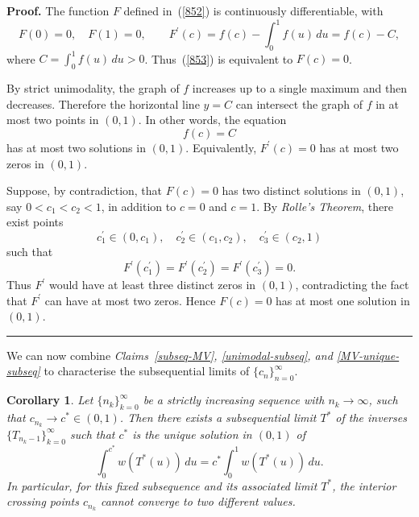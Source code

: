 \documentclass[onecolumn]{article}
\newtheorem{corollary}[theorem]{Corollary}
\newenvironment{proof}[1][Proof]{\noindent\textbf{#1.} }{\ \rule{0.5em}{0.5em}}
\begin{document}
\begin{proof}
The function $F$ defined in~(\ref{852}) is continuously differentiable, with 
\begin{equation}
F(0)=0,\quad F(1)=0,\qquad F^{\prime }(c)=f(c)-\int_{0}^{1}f(u)\,du=f(c)-C,
\label{854}
\end{equation}%
where $C=\int_{0}^{1}f(u)\,du>0$. Thus~(\ref{853}) is equivalent to $F(c)=0$.

By strict unimodality, the graph of $f$ increases up to a single maximum and
then decreases. Therefore the horizontal line $y=C$ can intersect the graph
of $f$ in at most two points in $(0,1)$. In other words, the equation 
\begin{equation}
f(c)=C  \label{855}
\end{equation}%
has at most two solutions in $(0,1)$. Equivalently, $F^{\prime }(c)=0$ has
at most two zeros in $(0,1)$.

Suppose, by contradiction, that $F(c)=0$ has two distinct solutions in $%
(0,1) $, say $0<c_{1}<c_{2}<1$, in addition to $c=0$ and $c=1$. By \textit{%
Rolle's Theorem}, there exist points 
\begin{equation}
c_{1}^{\prime }\in (0,c_{1}),\quad c_{2}^{\prime }\in (c_{1},c_{2}),\quad
c_{3}^{\prime }\in (c_{2},1)  \label{856}
\end{equation}%
such that 
\begin{equation}
F^{\prime }(c_{1}^{\prime })=F^{\prime }(c_{2}^{\prime })=F^{\prime
}(c_{3}^{\prime })=0.  \label{857}
\end{equation}%
Thus $F^{\prime }$ would have at least three distinct zeros in $(0,1)$,
contradicting the fact that $F^{\prime }$ can have at most two zeros. Hence $%
F(c)=0$ has at most one solution in $(0,1)$. \medskip
\end{proof}

We can now combine \textit{Claims~\ref{subseq-MV}, \ref{unimodal-subseq},
and \ref{MV-unique-subseq}} to characterise the subsequential limits of $%
\{c_{n}\}_{n=0}^{\infty }$.

\begin{corollary}
\label{subseq-c} Let $\{n_{k}\}_{k=0}^{\infty }$ be a strictly increasing
sequence with $n_{k}\rightarrow \infty $, such that $c_{n_{k}}\rightarrow
c^{\ast }\in (0,1)$. Then there exists a subsequential limit $T^{\ast }$ of
the inverses $\{T_{n_{k}-1}\}_{k=0}^{\infty }$ such that $c^{\ast }$ is the
unique solution in $(0,1)$ of 
\begin{equation}
\int_{0}^{c^{\ast }}w(T^{\ast }(u))\,du=c^{\ast }\int_{0}^{1}w(T^{\ast
}(u))\,du.  \label{858}
\end{equation}%
In particular, for this fixed subsequence and its associated limit $T^{\ast
} $, the interior crossing points $c_{n_{k}}$ cannot converge to two
different values.
\end{corollary}
\end{document}
